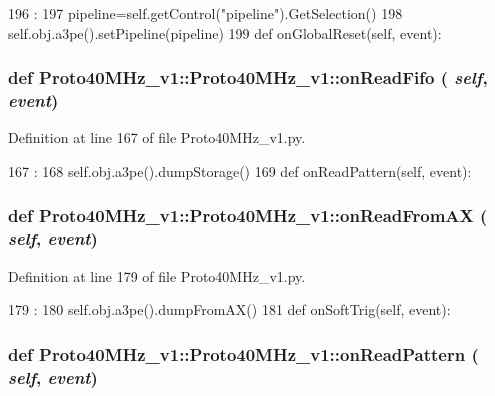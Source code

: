 \begin{DoxyCode}
196                                :
197         pipeline=self.getControl("pipeline").GetSelection()
198         self.obj.a3pe().setPipeline(pipeline)
199 
    def onGlobalReset(self, event):
\end{DoxyCode}
\hypertarget{classProto40MHz__v1_1_1Proto40MHz__v1_a2fb8cc3ec38763ada1a27fa4e4137208}{
\subsubsection[{onReadFifo}]{\setlength{\rightskip}{0pt plus 5cm}def Proto40MHz\_\-v1::Proto40MHz\_\-v1::onReadFifo ( {\em self}, \/   {\em event})}}
\label{classProto40MHz__v1_1_1Proto40MHz__v1_a2fb8cc3ec38763ada1a27fa4e4137208}


Definition at line 167 of file Proto40MHz\_\-v1.py.


\begin{DoxyCode}
167                                :
168         self.obj.a3pe().dumpStorage()
169 
    def onReadPattern(self, event):
\end{DoxyCode}
\hypertarget{classProto40MHz__v1_1_1Proto40MHz__v1_aa3f5a0cfb0cd36010d655aaacacf47d2}{
\subsubsection[{onReadFromAX}]{\setlength{\rightskip}{0pt plus 5cm}def Proto40MHz\_\-v1::Proto40MHz\_\-v1::onReadFromAX ( {\em self}, \/   {\em event})}}
\label{classProto40MHz__v1_1_1Proto40MHz__v1_aa3f5a0cfb0cd36010d655aaacacf47d2}


Definition at line 179 of file Proto40MHz\_\-v1.py.


\begin{DoxyCode}
179                                  :
180         self.obj.a3pe().dumpFromAX()
181 
    def onSoftTrig(self, event):
\end{DoxyCode}
\hypertarget{classProto40MHz__v1_1_1Proto40MHz__v1_afd43e744880663f93269829bbf854ad2}{
\subsubsection[{onReadPattern}]{\setlength{\rightskip}{0pt plus 5cm}def Proto40MHz\_\-v1::Proto40MHz\_\-v1::onReadPattern ( {\em self}, \/   {\em event})}}
\label{classProto40MHz__v1_1_1Proto40MHz__v1_afd43e744880663f93269829bbf854ad2}


